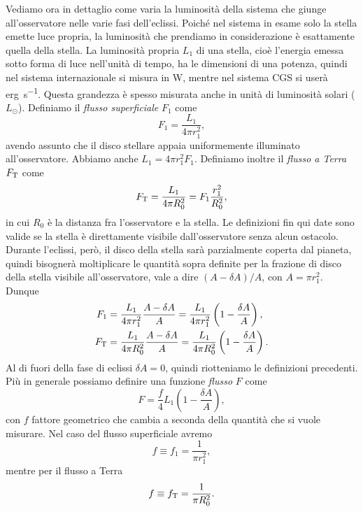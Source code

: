 Vediamo ora in dettaglio come varia la luminosità della sistema che giunge
all'osservatore nelle varie fasi dell'eclissi. Poiché nel sistema in esame solo
la stella emette luce propria, la luminosità che prendiamo in considerazione è
esattamente quella della stella. La luminosità propria $L_1$ di una stella,
cioè l'energia emessa sotto forma di luce nell'unità di tempo, ha le dimensioni
di una potenza, quindi nel sistema internazionale si misura in \si{\watt},
mentre nel sistema CGS si userà \si{erg\per \second}. Questa grandezza è spesso
misurata anche in unità di luminosità solari ($L_\odot$). Definiamo il
\emph{flusso superficiale} $F_1$ come
\begin{equation}
    F_1 = \frac{L_1}{4\pi r_1^2},
\end{equation}
avendo assunto che il disco stellare appaia uniformemente illuminato
all'osservatore. Abbiamo anche $L_1 = 4\pi r_1^2 F_1$. Definiamo
inoltre il \emph{flusso a Terra} $F_{\textup{T}}$ come
\begin{equation}
  F_{\textup{T}} = \frac{L_1}{4\pi R_0^2} = F_1 \frac{r_1^2}{R_0^2},
\end{equation}
in cui $R_0$ è la distanza fra l'osservatore e la stella. Le definizioni fin qui
date sono valide se la stella è direttamente visibile dall'osservatore senza
alcun ostacolo. Durante l'eclissi, però, il disco della stella sarà parzialmente
coperta dal pianeta, quindi bisognerà moltiplicare le quantità sopra definite
per la frazione di disco della stella visibile all'osservatore, vale a dire
$(A - \delta A)/A$, con $A= \pi r_1^2$. Dunque
\begin{align}
  F_1 &= \frac{L_1}{4\pi r_1^2} \frac{A - \delta A}{A} =
  \frac{L_1}{4\pi r_1^2} \left( 1 - \frac{\delta A}{A} \right), \\
  F_{\textup{T}} &= \frac{L_1}{4\pi R_0^2} \frac{A - \delta A}{A} =
  \frac{L_1}{4\pi R_0^2} \left( 1 - \frac{\delta A}{A} \right).
\end{align}
Al di fuori della fase di eclissi $\delta A = 0$, quindi riotteniamo le
definizioni precedenti. Più in generale possiamo definire una funzione
\emph{flusso} $F$ come
\begin{equation}
  F = \frac{f}{4} L_1 \left( 1 - \frac{\delta A}{A} \right),
\end{equation}
con $f$ fattore geometrico che cambia a seconda della quantità che si vuole
misurare. Nel caso del flusso superficiale avremo
\begin{equation}
  f \equiv f_1 = \frac{1}{\pi r_1^2},
\end{equation}
mentre per il flusso a Terra
\begin{equation}
  f \equiv f_{\textup{T}} = \frac{1}{\pi R_0^2}.
\end{equation}

